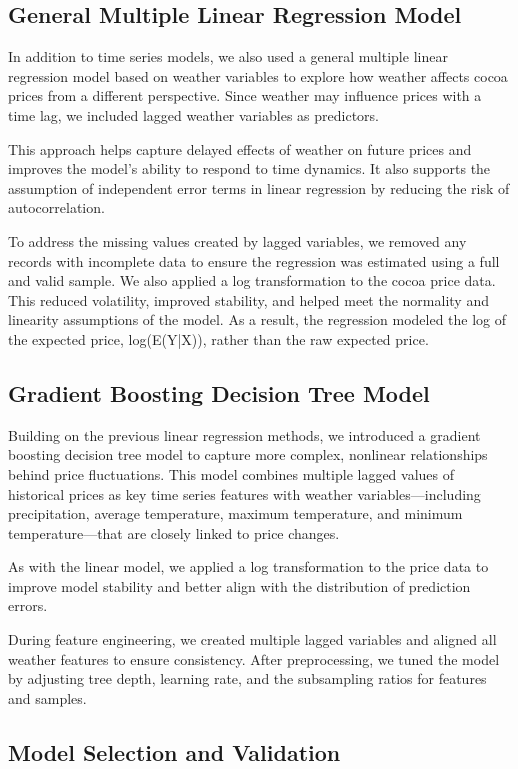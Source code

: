 \documentclass[10pt]{article}
\begin{document}
\subsection{General Multiple Linear Regression Model}
In addition to time series models, we also used a general multiple linear regression model based on weather variables to explore how weather affects cocoa prices from a different perspective. Since weather may influence prices with a time lag, we included lagged weather variables as predictors.

\noindent
This approach helps capture delayed effects of weather on future prices and improves the model’s ability to respond to time dynamics. It also supports the assumption of independent error terms in linear regression by reducing the risk of autocorrelation.

\noindent
To address the missing values created by lagged variables, we removed any records with incomplete data to ensure the regression was estimated using a full and valid sample. We also applied a log transformation to the cocoa price data. This reduced volatility, improved stability, and helped meet the normality and linearity assumptions of the model. As a result, the regression modeled the log of the expected price, log(E(Y|X)), rather than the raw expected price.

\subsection{Gradient Boosting Decision Tree Model}
Building on the previous linear regression methods, we introduced a gradient boosting decision tree model to capture more complex, nonlinear relationships behind price fluctuations. This model combines multiple lagged values of historical prices as key time series features with weather variables—including precipitation, average temperature, maximum temperature, and minimum temperature—that are closely linked to price changes. 

\noindent
As with the linear model, we applied a log transformation to the price data to improve model stability and better align with the distribution of prediction errors. 

\noindent
During feature engineering, we created multiple lagged variables and aligned all weather features to ensure consistency. After preprocessing, we tuned the model by adjusting tree depth, learning rate, and the subsampling ratios for features and samples. 

\subsection{Model Selection and Validation}
\end{document}

